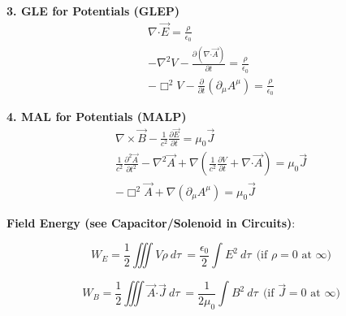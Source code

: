 \documentclass[12pt]{article}
\newcommand*{\dotP}{\boldsymbol \cdot}		%
\begin{document}
\vspace{20pt}
\begin{minipage}[t]{0.48\textwidth}
	\textbf{3. GLE for Potentials (GLEP)}
	\begin{gather*}
		\nabla \dotP \vec{E} = \frac{\rho}{\epsilon_0} \\[10pt]
		- \nabla^2 V - \frac{\partial (\nabla \dotP \vec{A})}{\partial t} = \frac{\rho}{\epsilon_0} \\[10pt]
		\boxed{ - \Box^2 V - \frac{\partial}{\partial t} ( \partial_\mu A^\mu ) = \frac{\rho}{\epsilon_0} }
	\end{gather*}
\end{minipage} 
\hspace{0\textwidth}
\begin{minipage}[t]{0.48\textwidth}
	\textbf{4. MAL for Potentials (MALP)}
	\begin{gather*}
		\nabla \times \vec{B} - \frac{1}{c^2} \frac{\partial \vec{E}}{\partial t} = \mu_0 \vec{J} \\[10pt]
		\frac{1}{c^2} \frac{\partial^2 \vec{A}}{\partial t^2} - \nabla^2 \vec{A} 
			+ \nabla \left ( \frac{1}{c^2} \frac{\partial V}{\partial t} + \nabla \dotP \vec{A} \right )
			= \mu_0 \vec{J} 
			\\[10pt]
		\boxed{ - \Box^2 \vec{A} + \nabla ( \partial_\mu A^\mu )
			= \mu_0 \vec{J} }
	\end{gather*} 
\end{minipage} 

\vspace{30pt} \noindent
\textbf{Field Energy (see Capacitor/Solenoid in Circuits)}:

\vspace{10pt}
\begin{minipage}{.49\textwidth}
	\[ \boxed{W_E = \frac{1}{2} \iiint V \rho \ d\tau} 
		\ = \frac{\epsilon_0}{2} \int E^2 \ d\tau 
		\ \ \text{(if \(\rho=0\) at \(\infty\))} \]
\end{minipage}
\begin{minipage}{.49\textwidth}
	\[ \boxed{ W_B = \frac{1}{2} \iiint \vec{A} \dotP \vec{J} \ d\tau }
		\ = \frac{1}{2 \mu_0} \int B^2 \ d\tau 
		\ \ \text{(if \(\vec{J}=0\) at \(\infty\))} \]
\end{minipage}

%
%
\newpage
\end{document}
